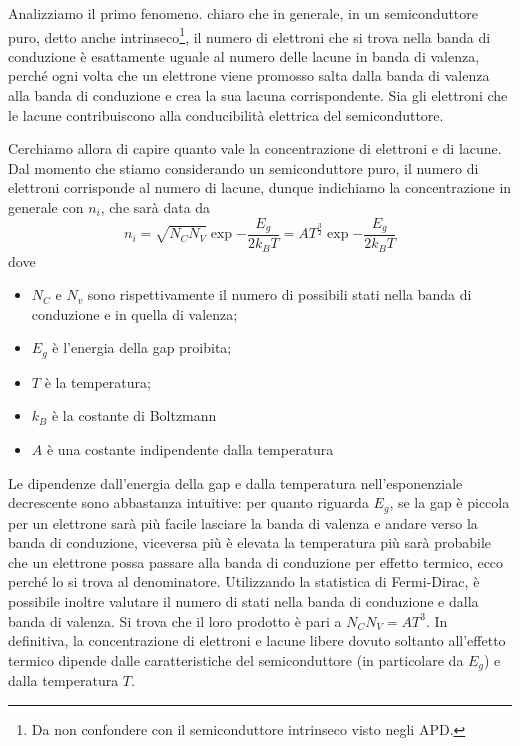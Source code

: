 Analizziamo il primo fenomeno. \E chiaro che in generale, in un semiconduttore puro, detto anche intrinseco\footnote{Da non confondere con il semiconduttore intrinseco visto negli APD.}, il numero di elettroni che si trova nella banda di conduzione è esattamente uguale al numero delle lacune in banda di valenza, perché ogni volta che un elettrone viene promosso salta dalla banda di valenza alla banda di conduzione e crea la sua lacuna corrispondente. Sia gli elettroni che le lacune contribuiscono alla conducibilità elettrica del semiconduttore. 

Cerchiamo allora di capire quanto vale la concentrazione di elettroni e di lacune. Dal momento che stiamo considerando un semiconduttore puro, il numero di elettroni corrisponde al numero di lacune, dunque indichiamo la concentrazione in generale con $n_i$, che sarà data da
\begin{equation*}
   n_i
   =\sqrt{N_C N_V} \exp{ -\frac{E_g}{2k_B T} }
   =AT^{\frac{3}{2}} \exp{ -\frac{E_g}{2k_B T} }
\end{equation*}
dove
\begin{itemize}[leftmargin=0.5cm]
   \item $N_C$ e $N_v$ sono rispettivamente il numero di possibili stati nella banda di conduzione e in quella di valenza;
   \item $E_g$ è l'energia della gap proibita;
   \item $T$ è la temperatura;
   \item $k_B$ è la costante di Boltzmann
   \item $A$ è una costante indipendente dalla temperatura
\end{itemize}

Le dipendenze dall'energia della gap e dalla temperatura nell'esponenziale decrescente sono abbastanza intuitive: per quanto riguarda $E_g$, se la gap è piccola per un elettrone sarà più facile lasciare la banda di valenza e andare verso la banda di conduzione, viceversa più è elevata la temperatura più sarà probabile che un elettrone possa passare alla banda di conduzione per effetto termico, ecco perché lo si trova al denominatore. Utilizzando la statistica di Fermi-Dirac, è possibile inoltre valutare il numero di stati nella banda di conduzione e dalla banda di valenza. Si trova che il loro prodotto è pari a $N_C N_V=AT^3$. In definitiva, la concentrazione di elettroni e lacune libere dovuto soltanto all'effetto termico dipende dalle caratteristiche del semiconduttore (in particolare da $E_g$) e dalla temperatura $T$. 

